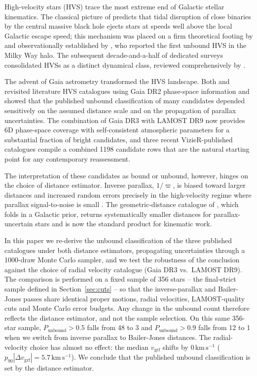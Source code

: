 \documentclass{caosp310}
\newcommand{\vgrf}{v_{\mathrm{grf}}}
\newcommand{\Punb}{P_{\mathrm{unbound}}}
\newcommand{\kmps}{\ensuremath{\,\mathrm{km}\,\mathrm{s}^{-1}}}
\begin{document}
High-velocity stars (HVS) trace the most extreme end of Galactic stellar
kinematics. The classical picture of \citet{Hills1988HVS} predicts that
tidal disruption of close binaries by the central massive black hole
ejects stars at speeds well above the local Galactic escape speed; this
mechanism was placed on a firm theoretical footing by
\citet{YuTremaine2003Ejection} and observationally established by
\citet{Brown2005FirstHVS}, who reported the first unbound HVS in the Milky
Way halo. The subsequent decade-and-a-half of dedicated surveys
\citep[][and references therein]{Brown2007BoundHVS,Kenyon2008HVSGCtoHalo,
Brown2014MMTSurvey} consolidated HVSs as a distinct dynamical class,
reviewed comprehensively by \citet{Brown2015HVSReview}.

The advent of Gaia astrometry transformed the HVS landscape. Both
\citet{Boubert2018Revisiting} and \citet{Marchetti2019Fastest} revisited
literature HVS catalogues using Gaia DR2 phase-space information and showed
that the published unbound classification of many candidates depended
sensitively on the assumed distance scale and on the propagation of
parallax uncertainties. The combination of Gaia DR3 with LAMOST DR9
\citep{Cui2012LAMOST,Yan2022LAMOSTDecade} now provides 6D phase-space
coverage with self-consistent atmospheric parameters for a substantial
fraction of bright candidates, and three recent VizieR-published catalogues
\citep{Li2021HVS591,Li2023ExtremeVelocity88,Liao2024HVS519} compile a
combined 1198 candidate rows that are the natural starting point for any
contemporary reassessment.

The interpretation of these candidates as bound or unbound, however,
hinges on the choice of distance estimator. Inverse parallax, $1/\varpi$,
is biased toward larger distances and increased random errors precisely in
the high-velocity regime where parallax signal-to-noise is small
\citep{BailerJones2015Distances,Luri2018GaiaParallaxes,Lindegren2021ParallaxBias}.
The geometric-distance catalogue of \citet{BailerJones2021Distances},
which folds in a Galactic prior, returns systematically smaller distances
for parallax-uncertain stars and is now the standard product for kinematic
work.

In this paper we re-derive the unbound classification of the three
published catalogues under both distance estimators, propagating
uncertainties through a 1000-draw Monte Carlo sampler, and we test the
robustness of the conclusion against the choice of radial velocity
catalogue (Gaia DR3 vs.\ LAMOST DR9). The comparison is performed on a
fixed sample of 356 stars -- the final-strict sample defined in
Section~\ref{sec:cuts} -- so that the inverse-parallax and Bailer-Jones
passes share identical proper motions, radial velocities,
LAMOST-quality cuts and Monte Carlo error budgets. Any change in the
unbound count therefore reflects the distance estimator, and not the
sample selection.
On this same 356-star sample, $\Punb>0.5$ falls from 48 to 3 and
$\Punb>0.9$ falls from 12 to 1 when we switch from inverse parallax to
Bailer-Jones distances. The radial-velocity choice has almost no
effect: the median $\vgrf$ shifts by $0\kmps$
($p_{90}|\Delta\vgrf|=5.7\kmps$). We conclude that the published
unbound classification is set by the distance estimator.
\end{document}
